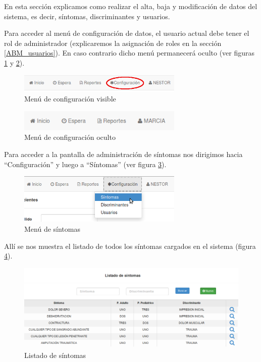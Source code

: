 En esta sección explicamos como realizar el alta, baja y modificación de datos del sistema, es decir, síntomas, discriminantes y usuarios.

Para acceder al menú de configuración de datos, el usuario actual debe tener el rol de administrador (explicaremos la asignación de roles en la sección \ref{ABM_usuarios}). En caso contrario dicho menú permanecerá oculto (ver figuras \ref{fig:menu_conf_visible} y \ref{fig:menu_conf_oculto}).

\begin{figure}
\centerline{\includegraphics[width=0.7\textwidth]{menu_configuracion_visible.png}}
\caption{Menú de configuración visible}
\label{fig:menu_conf_visible}
\end{figure}

\begin{figure}
\centerline{\includegraphics[width=0.7\textwidth]{menu_configuracion_oculto.png}}
\caption{Menú de configuración oculto}
\label{fig:menu_conf_oculto}
\end{figure}

\label{cap:ABM_sintomas}
Para acceder a la pantalla de administración de síntomas nos dirigimos hacia ``Configuración'' y luego a ``Síntomas'' (ver figura \ref{fig:menu_sintomas}).
\begin{figure}
\centerline{\includegraphics[width=0.7\textwidth]{menu_sintomas.png}}
\caption{Menú de síntomas}
\label{fig:menu_sintomas}
\end{figure}
Allí se nos muestra el listado de todos los síntomas cargados en el sistema (figura \ref{fig:listado_sintomas}).

\begin{figure}
\centerline{\includegraphics[width=1\textwidth]{listado_sintomas.png}}
\caption{Listado de síntomas}
\label{fig:listado_sintomas}
\end{figure}

